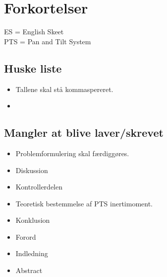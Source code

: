 \section*{Forkortelser}

ES = English Skeet \\
PTS = Pan and Tilt System

\subsection*{Huske liste}
\begin{itemize}
\item Tallene skal stå kommaspereret.
\item {}
\end{itemize}



\subsection*{Mangler at blive laver/skrevet}
\begin{itemize}
\item Problemformulering skal færdiggøres. 
\item Diskussion
\item Kontrollerdelen
\item Teoretisk bestemmelse af PTS inertimoment. 
\item Konklusion
\item Forord
\item Indledning
\item Abstract

\listoftodos

\end{itemize}